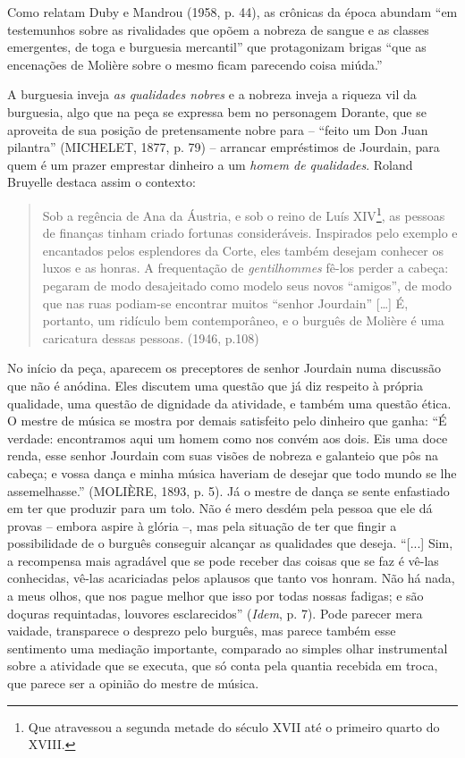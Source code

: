 Como relatam Duby e Mandrou (1958, p. 44), as crônicas da época abundam
``em testemunhos sobre as rivalidades que opõem a nobreza de sangue e as
classes emergentes, de toga e burguesia mercantil'' que protagonizam
brigas ``que as encenações de Molière sobre o mesmo ficam parecendo
coisa miúda.''

A burguesia inveja \emph{as qualidades nobres} e a nobreza inveja a
riqueza vil da burguesia, algo que na peça se expressa bem no personagem
Dorante, que se aproveita de sua posição de pretensamente nobre para --
``feito um Don Juan pilantra'' (MICHELET, 1877, p. 79) -- arrancar
empréstimos de Jourdain, para quem é um prazer emprestar dinheiro a um
\emph{homem de qualidades}. Roland Bruyelle destaca assim o contexto:

\begin{quote}
Sob a regência de Ana da Áustria, e sob o reino de Luís XIV\footnote{Que
  atravessou a segunda metade do século XVII até o primeiro quarto do
  XVIII.}, as pessoas de finanças tinham criado fortunas consideráveis.
Inspirados pelo exemplo e encantados pelos esplendores da Corte, eles
também desejam conhecer os luxos e as honras. A frequentação de
\emph{gentilhommes} fê-los perder a cabeça: pegaram de modo desajeitado
como modelo seus novos ``amigos'', de modo que nas ruas podiam-se
encontrar muitos ``senhor Jourdain'' {[}\ldots{}{]} É, portanto, um
ridículo bem contemporâneo, e o burguês de Molière é uma caricatura
dessas pessoas. (1946, p.108)
\end{quote}

No início da peça, aparecem os preceptores de senhor Jourdain numa
discussão que não é anódina. Eles discutem uma questão que já diz
respeito à própria qualidade, uma questão de dignidade da atividade, e
também uma questão ética. O mestre de música se mostra por demais
satisfeito pelo dinheiro que ganha: ``É verdade: encontramos aqui um
homem como nos convém aos dois. Eis uma doce renda, esse senhor Jourdain
com suas visões de nobreza e galanteio que pôs na cabeça; e vossa dança
e minha música haveriam de desejar que todo mundo se lhe assemelhasse.''
(MOLIÈRE, 1893, p. 5). Já o mestre de dança se sente enfastiado em ter
que produzir para um tolo. Não é mero desdém pela pessoa que ele dá
provas -- embora aspire à glória --, mas pela situação de ter que fingir
a possibilidade de o burguês conseguir alcançar as qualidades que
deseja. ``{[}...{]} Sim, a recompensa mais agradável que se pode receber
das coisas que se faz é vê-las conhecidas, vê-las acariciadas pelos
aplausos que tanto vos honram. Não há nada, a meus olhos, que nos pague
melhor que isso por todas nossas fadigas; e são doçuras requintadas,
louvores esclarecidos'' (\emph{Idem}, p. 7). Pode parecer mera vaidade,
transparece o desprezo pelo burguês, mas parece também esse sentimento
uma mediação importante, comparado ao simples olhar instrumental sobre a
atividade que se executa, que só conta pela quantia recebida em troca,
que parece ser a opinião do mestre de música.

